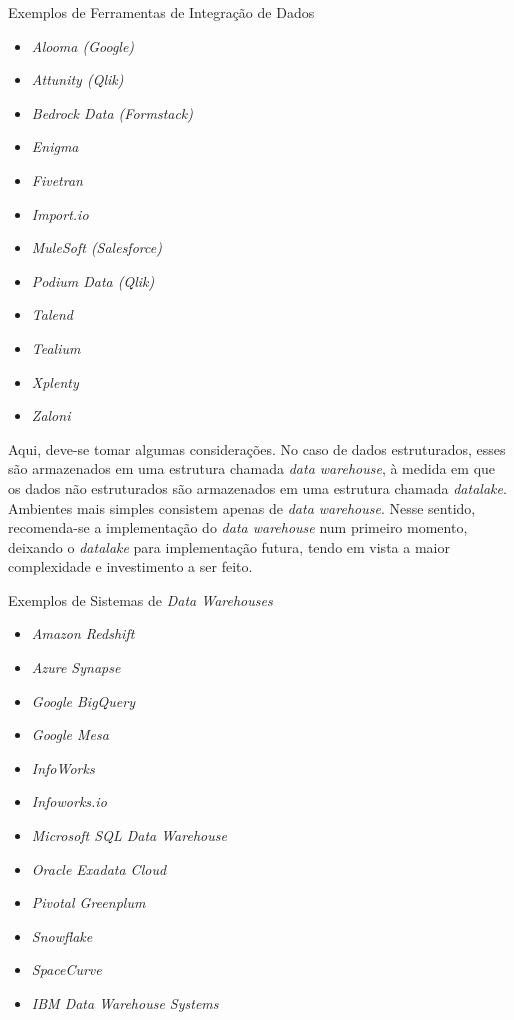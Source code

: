 \begin{env-sistemas}{Exemplos de Ferramentas de Integração de Dados}
     \begin{multicols}{2}
        \begin{itemize}
            \item \emph{Alooma (Google)}
            \item \emph{Attunity (Qlik)}
            \item \emph{Bedrock Data (Formstack)}
            \item \emph{Enigma}
            \item \emph{Fivetran}
            \item \emph{Import.io}
            \item \emph{MuleSoft (Salesforce)}
            \item \emph{Podium Data (Qlik)}
            \item \emph{Talend}
            \item \emph{Tealium}
            \item \emph{Xplenty}
            \item \emph{Zaloni}
        \end{itemize}
    \end{multicols}
\end{env-sistemas}

Aqui, deve-se tomar algumas considerações. No caso de dados estruturados, esses são armazenados em uma estrutura chamada \emph{data warehouse}, à medida em que os dados não estruturados são armazenados em uma estrutura chamada \emph{datalake}. Ambientes mais simples consistem apenas de \emph{data warehouse}. Nesse sentido, recomenda-se a implementação do \emph{data warehouse} num primeiro momento, deixando o \emph{datalake} para implementação futura, tendo em vista a maior complexidade e investimento a ser feito.

\begin{env-sistemas}{Exemplos de Sistemas de \em{Data Warehouses}}
     \begin{multicols}{2}
        \begin{itemize}
            \item \emph{Amazon Redshift}
            \item \emph{Azure Synapse}
            \item \emph{Google BigQuery}
            \item \emph{Google Mesa}
            \item \emph{InfoWorks}
            \item \emph{Infoworks.io}
            \item \emph{Microsoft SQL Data Warehouse}
            \item \emph{Oracle Exadata Cloud}
            \item \emph{Pivotal Greenplum}
            \item \emph{Snowflake}
            \item \emph{SpaceCurve}
            \item \emph{IBM Data Warehouse Systems}
        \end{itemize}
    \end{multicols}
\end{env-sistemas}

